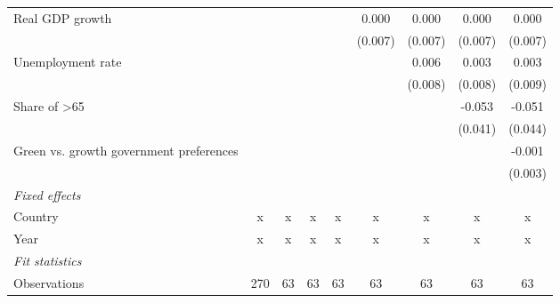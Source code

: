 \begin{table}[htbp]
\begin{tabular}{lcccccccc}
      Real GDP growth                                                         &         &         &               &                & 0.000          & 0.000          & 0.000          & 0.000\\   
                                                                              &         &         &               &                & (0.007)        & (0.007)        & (0.007)        & (0.007)\\   
      Unemployment rate                                                       &         &         &               &                &                & 0.006          & 0.003          & 0.003\\   
                                                                              &         &         &               &                &                & (0.008)        & (0.008)        & (0.009)\\   
      Share of >65                                                            &         &         &               &                &                &                & -0.053         & -0.051\\   
                                                                              &         &         &               &                &                &                & (0.041)        & (0.044)\\   
      Green vs. growth government preferences                                 &         &         &               &                &                &                &                & -0.001\\   
                                                                              &         &         &               &                &                &                &                & (0.003)\\   
      \emph{Fixed effects}\\
      Country                                                                 & x       & x       & x             & x              & x              & x              & x              & x\\  
      Year                                                                    & x       & x       & x             & x              & x              & x              & x              & x\\  
      \midrule \emph{Fit statistics}\\
      Observations                                                            & 270     & 63      & 63            & 63             & 63             & 63             & 63             & 63\\  

\end{tabular}
\end{table}
